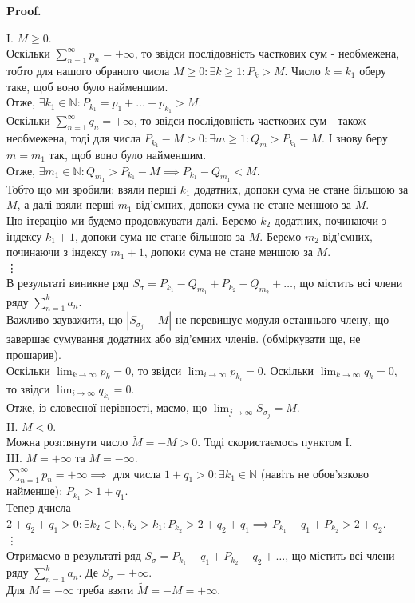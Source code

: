 \documentclass[a4paper, 10pt]{article}
\makeatletter
\def\huge{\displaystyle}
\def\qed{$\blacksquare$}
\theoremstyle{theoremdd}
\theoremstyle{theoremdd}
\theoremstyle{theoremdd}
\theoremstyle{theoremdd}
\theoremstyle{theoremdd}
\theoremstyle{theoremdd}
\theoremstyle{theoremdd}
\theoremstyle{theoremdd}
\theoremstyle{theoremdd}
\renewenvironment{proof}[1][Proof.\\]{\par
\pushQED{\hfill \qed}%
\normalfont \topsep6\p@\@plus6\p@\relax
\trivlist
\item\relax
{\bfseries
#1\@addpunct{.}}\hspace\labelsep\ignorespaces
}{%
\popQED\endtrivlist\@endpefalse
}
\makeatother
\begin{document}
\begin{proof}
I. $M \geq 0$.\\
Оскільки $\huge\sum_{n=1}^\infty p_n = +\infty$, то звідси послідовність часткових сум - необмежена, тобто для нашого обраного числа $M \geq 0: \exists k \geq 1: P_k > M$. Число $k = k_1$ оберу таке, щоб воно було найменшим.\\
Отже, $\exists k_1 \in \mathbb{N}: P_{k_1} = p_1 + \dots + p_{k_1} > M$.\\
Оскільки $\huge\sum_{n=1}^\infty q_n = +\infty$, то звідси послідовність часткових сум - також необмежена, тоді для числа $P_{k_1}-M>0: \exists m \geq 1: Q_m > P_{k_1}-M$. І знову беру $m = m_1$ так, щоб воно було найменшим.\\
Отже, $\exists m_1 \in \mathbb{N}: Q_{m_1} > P_{k_1} - M \implies P_{k_1} - Q_{m_1} < M$.\\
Тобто що ми зробили: взяли перші $k_1$ додатних, допоки сума не стане більшою за $M$, а далі взяли перші $m_1$ від'ємних, допоки сума не стане меншою за $M$.\\
Цю ітерацію ми будемо продовжувати далі. Беремо $k_2$ додатних, починаючи з індексу $k_1+1$, допоки сума не стане більшою за $M$. Беремо $m_2$ від'ємних, починаючи з індексу $m_1+1$, допоки сума не стане меншою за $M$.\\
\vdots \\
В результаті виникне ряд $S_{\sigma} = P_{k_1} - Q_{m_1} + P_{k_2} - Q_{m_2} + \dots$, що містить всі члени ряду $\huge\sum_{n=1}^k a_n$.\\
Важливо зауважити, що $|S_{\sigma_j} - M|$ не перевищує модуля останнього члену, що завершає сумування додатних або від'ємних членів. (обміркувати ще, не прошарив).\\
Оскільки $\huge\lim_{k \to \infty} p_k = 0$, то звідси $\huge\lim_{i \to \infty} p_{k_i} = 0$. Оскільки $\huge\lim_{k \to \infty} q_k = 0$, то звідси $\huge\lim_{i \to \infty} q_{k_i} = 0$.\\
Отже, із словесної нерівності, маємо, що $\huge\lim_{j \to \infty} S_{\sigma_j} = M$.
\bigskip \\
II. $M < 0$.\\
Можна розглянути число $\tilde{M} = -M > 0$. Тоді скористаємось пунктом I.
\bigskip \\
III. $M = +\infty$ та $M = -\infty$.\\
$\huge\sum_{n=1}^\infty p_n = +\infty \implies$ для числа $1+q_1 >0: \exists k_1 \in \mathbb{N}$ (навіть не обов'язково найменше): $P_{k_1} > 1 + q_1$.\\
Тепер дчисла $2+q_2+q_1 > 0: \exists k_2 \in \mathbb{N}, k_2 > k_1: P_{k_2} > 2+q_2+q_1 \implies P_{k_1} - q_1 + P_{k_2} > 2+q_2$.\\
\vdots \\
Отримаємо в результаті ряд $S_{\sigma} = P_{k_1} - q_1 + P_{k_2} - q_2 + \dots$, що містить всі члени ряду $\huge\sum_{n=1}^k a_n$. Де $S_\sigma = +\infty$.\\
Для $M = -\infty$ треба взяти $\tilde{M} = -M = +\infty$.
\end{proof}
\fi
\end{document}
